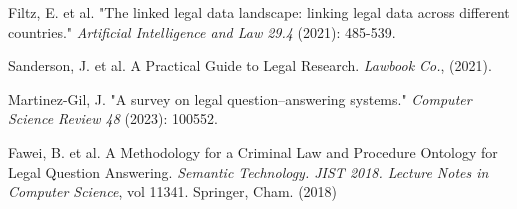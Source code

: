 
Filtz, E. et al. "The linked legal data landscape: linking legal data across different countries." \textit{Artificial Intelligence and Law 29.4} (2021): 485-539.

Sanderson, J. et al. A Practical Guide to Legal Research. \textit{Lawbook Co.}, (2021).

Martinez-Gil, J. "A survey on legal question–answering systems." \textit{Computer Science Review 48} (2023): 100552.

Fawei, B. et al. A Methodology for a Criminal Law and Procedure Ontology for Legal Question Answering. \textit{ Semantic Technology. JIST 2018. Lecture Notes in Computer Science}, vol 11341. Springer, Cham. (2018)